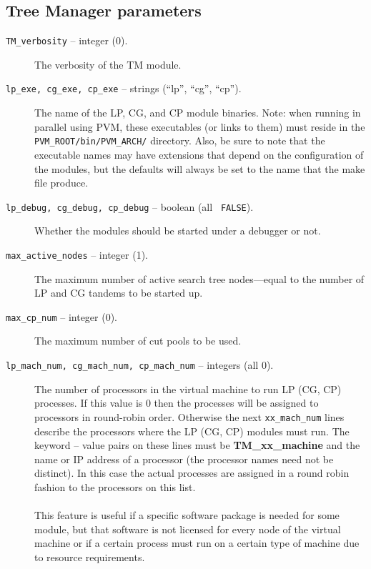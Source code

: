 \subsection{Tree Manager parameters}
\label{tm_params}
\begin{description}

\item[{\tt TM\_verbosity} -- integer (0).]
The verbosity of the TM module.

\item[{\tt lp\_exe, cg\_exe, cp\_exe} -- strings (``lp'', ``cg'',
``cp'').]
The name of the LP, CG, and CP module binaries. Note: when running in
parallel using PVM, these executables (or links to them) must reside
in the {\tt PVM\_ROOT/bin/PVM\_ARCH/} directory. Also, be sure to note
that the executable names may have extensions that depend on the
configuration of the modules, but the defaults will always be set to
the name that the make file produce.

\item[{\tt lp\_debug, cg\_debug, cp\_debug} -- boolean (all {\tt
FALSE}).]
Whether the modules should be started under a debugger or not.

\item[{\tt max\_active\_nodes} -- integer (1).]
The maximum number of active search tree nodes---equal to the number of
LP and CG tandems to be started up.

\item[{\tt max\_cp\_num} -- integer (0).]
The maximum number of cut pools to be used.

\item[{\tt lp\_mach\_num, cg\_mach\_num, cp\_mach\_num} -- integers
(all 0).]
The number of processors in the virtual machine to run LP (CG, CP)
processes. If this value is 0 then the processes will be assigned to
processors in round-robin order. Otherwise the next {\tt xx\_mach\_num} lines
describe the processors where the LP (CG, CP) modules must run. The
keyword -- value pairs on these lines must be {\bf TM\_xx\_machine} and the
name or IP address of a processor (the processor names need not be distinct).
In this case the actual processes are assigned in a round robin fashion to the
processors on this list.\\
\\
This feature is useful if a specific software package is needed for
some module, but that software is not licensed for every node of the
virtual machine or if a certain process must run on a certain type of
machine due to resource requirements.


\end{description}
